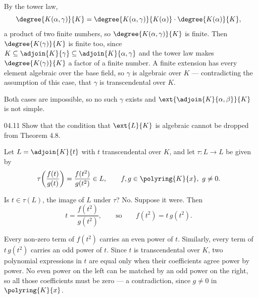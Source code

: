 \documentclass[11pt]{article}
\begin{document}
\begin{solution}
  By the tower law,
  \[
    \degree{K(\alpha,\gamma)}{K}
      = \degree{K(\alpha,\gamma)}{K(\alpha)} \cdot \degree{K(\alpha)}{K},
  \]
  a product of two finite numbers, so $\degree{K(\alpha,\gamma)}{K}$ is finite.
  Then $\degree{K(\gamma)}{K}$ is finite too, since
  $K \subseteq \adjoin{K}{\gamma} \subseteq \adjoin{K}{\alpha,\gamma}$ and the
  tower law makes $\degree{K(\gamma)}{K}$ a factor of a finite number. A finite
  extension has every element algebraic over the base field, so $\gamma$ is
  algebraic over $K$ --- contradicting the assumption of this case, that
  $\gamma$ is transcendental over $K$.

  \medskip
  Both cases are impossible, so no such $\gamma$ exists and
  $\ext{\adjoin{K}{\alpha,\beta}}{K}$ is not simple.
\end{solution}

\begin{problem}{04.11}
  Show that the condition that $\ext{L}{K}$ is algebraic cannot be dropped
  from Theorem 4.8.
\end{problem}
\begin{solution}
  Let $L = \adjoin{K}{t}$ with $t$ transcendental over $K$, and let
  $\tau : L \to L$ be given by
  \[
    \tau\!\left(\frac{f(t)}{g(t)}\right) = \frac{f(t^{2})}{g(t^{2})} \in L,
    \qquad f, g \in \polyring{K}{x}, \ g \neq 0.
  \]

  Is $t \in \tau(L)$, the image of $L$ under $\tau$? No. Suppose it were. Then
  \[
    t = \frac{f(t^{2})}{g(t^{2})},
    \qquad\text{so}\qquad
    f(t^{2}) = t\,g(t^{2}).
  \]

  Every non-zero term of $f(t^{2})$ carries an even power of $t$. Similarly,
  every term of $t\,g(t^{2})$ carries an odd power of $t$. Since $t$ is
  transcendental over $K$, two polynomial expressions in $t$ are equal only
  when their coefficients agree power by power. No even power on the left can
  be matched by an odd power on the right, so all those coefficients must be
  zero --- a contradiction, since $g \neq 0$ in $\polyring{K}{x}$.
\end{solution}
\end{document}
